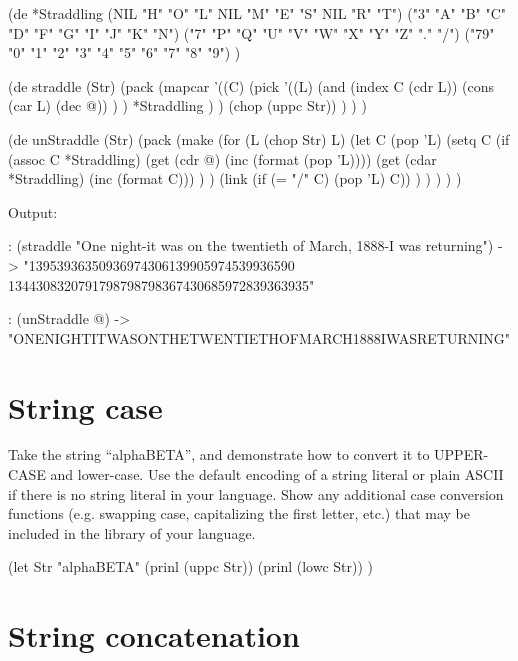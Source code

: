 \begin{itemize}
\begin{wideverbatim}

(de *Straddling
   (NIL  "H"  "O"  "L"  NIL  "M"  "E"  "S"  NIL  "R"  "T")
   ("3"  "A"  "B"  "C"  "D"  "F"  "G"  "I"  "J"  "K"  "N")
   ("7"  "P"  "Q"  "U"  "V"  "W"  "X"  "Y"  "Z"  "."  "/")
   ("79" "0"  "1"  "2"  "3"  "4"  "5"  "6"  "7"  "8"  "9") )

(de straddle (Str)
   (pack
      (mapcar
         '((C)
            (pick
               '((L)
                  (and
                     (index C (cdr L))
                     (cons (car L) (dec @)) ) )
               *Straddling ) )
         (chop (uppc Str)) ) ) )

(de unStraddle (Str)
   (pack
      (make
         (for (L (chop Str)  L)
            (let C (pop 'L)
               (setq C
                  (if (assoc C *Straddling)
                     (get (cdr @) (inc (format (pop 'L))))
                     (get (cdar *Straddling) (inc (format C))) ) )
               (link (if (= "/" C) (pop 'L) C)) ) ) ) ) )

Output:

: (straddle "One night-it was on the twentieth of March, 1888-I was returning")
-> "13953936350936974306139905974539936590
    1344308320791798798798367430685972839363935"

: (unStraddle @)
-> "ONENIGHTITWASONTHETWENTIETHOFMARCH1888IWASRETURNING"

\end{wideverbatim}

\pagebreak{}
\section*{String case}

Take the string ``alphaBETA'', and demonstrate how to convert it to
UPPER-CASE and lower-case. Use the default encoding of a string literal
or plain ASCII if there is no string literal in your language. Show any
additional case conversion functions (e.g. swapping case, capitalizing
the first letter, etc.) that may be included in the library of your
language.


\begin{wideverbatim}

(let Str "alphaBETA"
   (prinl (uppc Str))
   (prinl (lowc Str)) )

\end{wideverbatim}

\pagebreak{}
\section*{String concatenation}


\end{itemize}
